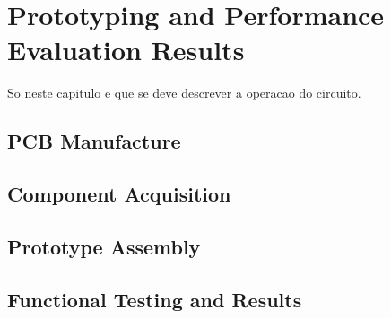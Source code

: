 

\chapter{Prototyping and Performance Evaluation Results}\label{cha:chapter4_PrototypingPerf}

So neste capitulo e que se deve descrever a operacao do circuito.

\section{PCB Manufacture}\label{sec:41_PCBmanufacture}

\section{Component Acquisition}\label{sec:42_ComponentAcquisition}

\section{Prototype Assembly}\label{sec:43_PrototypeAssembly}

\section{Functional Testing and Results}\label{sec:44_FunctionalTesting}

